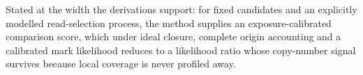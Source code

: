 \documentclass[11pt]{article}
\begin{document}
Stated at the width the derivations support: for fixed candidates and an
explicitly modelled read-selection process, the method supplies an
exposure-calibrated comparison score, which under ideal closure, complete origin
accounting and a calibrated mark likelihood reduces to a likelihood ratio whose
copy-number signal survives because local coverage is never profiled away.
\end{document}
